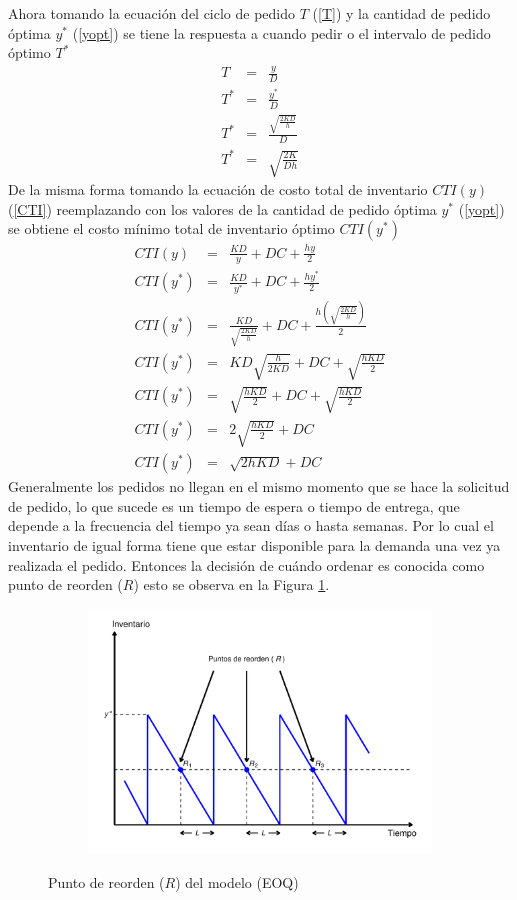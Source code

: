 Ahora tomando la ecuación del ciclo de pedido $T$ (\ref{T}) y la cantidad de pedido óptima $y^*$  (\ref{yopt}) se tiene la respuesta a cuando pedir o el intervalo de pedido óptimo $T^*$
\begin{eqnarray}
	\label{Topt}
	T &=& \frac{y}{D} \nonumber \\
	T^* &=& \frac{y^*}{D} \nonumber \\
	T^* &=& \frac{\sqrt{\frac{2KD}{h}}}{D} \nonumber \\
	T^* &=& \sqrt{\frac{2K}{Dh}}
\end{eqnarray}
De la misma forma tomando la ecuación de costo total de inventario $CTI(y)$ (\ref{CTI}) reemplazando con los valores de la cantidad de pedido óptima $y^*$ (\ref{yopt}) se obtiene el costo mínimo total de inventario óptimo $CTI(y^*)$
\begin{eqnarray}
	\label{CTIopt}
	CTI(y) &=& \frac{KD}{y} + DC + \frac{hy}{2} \nonumber \\
	CTI(y^*) &=& \frac{KD}{y^*} + DC + \frac{hy^*}{2} \nonumber \\
	CTI(y^*) &=& \frac{KD}{\sqrt{\frac{2KD}{h}}} + DC + \frac{h \left( \sqrt{\frac{2KD}{h}} \right)}{2} \nonumber \\ 
	CTI(y^*) &=& KD \sqrt{\frac{h}{2KD}} + DC + \sqrt{\frac{hKD}{2}} \nonumber \\
	CTI(y^*) &=& \sqrt{\frac{hKD}{2}} + DC + \sqrt{\frac{hKD}{2}} \nonumber \\
	CTI(y^*) &=& 2 \sqrt{\frac{hKD}{2}} + DC \nonumber \\
	CTI(y^*) &=& \sqrt{2hKD} + DC
\end{eqnarray}
Generalmente los pedidos no llegan en el mismo momento que se hace la solicitud de pedido, lo que sucede es un tiempo de espera o tiempo de entrega, que depende a la frecuencia del tiempo ya sean días o hasta semanas. Por lo cual el inventario de igual forma tiene que estar disponible para la demanda una vez ya realizada el pedido. Entonces la decisión de cuándo ordenar es conocida como punto de reorden ($R$) esto se observa en la Figura \ref{fig:img2}.
\begin{figure}[H]
  \caption{Punto de reorden ($R$) del modelo (EOQ)}
  {\includegraphics[width=15cm, height=6.5cm]{images/img2.pdf}}
  \label{fig:img2}
\end{figure}

